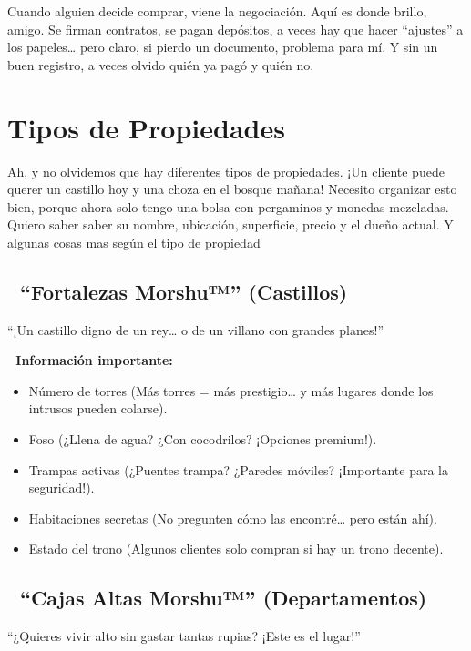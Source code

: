 \documentclass[
  letterpaper,
  DIV=11,
  numbers=noendperiod]{scrreprt}
\providecommand{\tightlist}{%
  \setlength{\itemsep}{0pt}\setlength{\parskip}{0pt}}\usepackage{longtable,booktabs,array}
\begin{document}
Cuando alguien decide comprar, viene la negociación. Aquí es donde
brillo, amigo. Se firman contratos, se pagan depósitos, a veces hay que
hacer ``ajustes'' a los papeles\ldots{} pero claro, si pierdo un
documento, problema para mí. Y sin un buen registro, a veces olvido
quién ya pagó y quién no.

\section{Tipos de Propiedades}\label{tipos-de-propiedades}

Ah, y no olvidemos que hay diferentes tipos de propiedades. ¡Un cliente
puede querer un castillo hoy y una choza en el bosque mañana! Necesito
organizar esto bien, porque ahora solo tengo una bolsa con pergaminos y
monedas mezcladas. Quiero saber saber su nombre, ubicación, superficie,
precio y el dueño actual. Y algunas cosas mas según el tipo de propiedad

\subsection{🏰 ``Fortalezas Morshu™'' (Castillos)
🏰}\label{fortalezas-morshu-castillos}

``¡Un castillo digno de un rey\ldots{} o de un villano con grandes
planes!''

\textbf{📜 Información importante:}

\begin{itemize}
\tightlist
\item
  Número de torres (Más torres = más prestigio\ldots{} y más lugares
  donde los intrusos pueden colarse).
\item
  Foso (¿Llena de agua? ¿Con cocodrilos? ¡Opciones premium!).
\item
  Trampas activas (¿Puentes trampa? ¿Paredes móviles? ¡Importante para
  la seguridad!).
\item
  Habitaciones secretas (No pregunten cómo las encontré\ldots{} pero
  están ahí).
\item
  Estado del trono (Algunos clientes solo compran si hay un trono
  decente).
\end{itemize}

\subsection{🏢 ``Cajas Altas Morshu™'' (Departamentos)
🏢}\label{cajas-altas-morshu-departamentos}

``¿Quieres vivir alto sin gastar tantas rupias? ¡Este es el lugar!''
\end{document}
